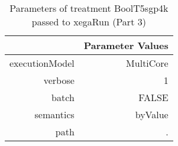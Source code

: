 \begin{table}[ht]
\centering
\begin{tabular}{rr}
  \hline
 & Parameter Values \\ 
  \hline
executionModel & MultiCore \\ 
  verbose & 1 \\ 
  batch & FALSE \\ 
  semantics & byValue \\ 
  path & . \\ 
   \hline
\end{tabular}
\caption{ Parameters of treatment BoolT5sgp4k passed to xegaRun
 (Part 3)} 
\end{table}
